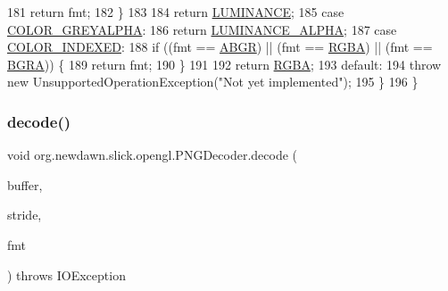 \begin{DoxyCode}
181                 \textcolor{keywordflow}{return} fmt;
182             \}
183             
184             \textcolor{keywordflow}{return} \mbox{\hyperlink{classorg_1_1newdawn_1_1slick_1_1opengl_1_1_p_n_g_decoder_a0ecc59fd1d47827a9c16df0bfbb033d2}{LUMINANCE}};
185         \textcolor{keywordflow}{case} \mbox{\hyperlink{classorg_1_1newdawn_1_1slick_1_1opengl_1_1_p_n_g_decoder_a0d509a1ae82f19ef4da0c9f2e0671d77}{COLOR\_GREYALPHA}}:
186             \textcolor{keywordflow}{return} \mbox{\hyperlink{classorg_1_1newdawn_1_1slick_1_1opengl_1_1_p_n_g_decoder_a1bf5eb8cd445b84d0b5a0861648d1ee4}{LUMINANCE\_ALPHA}};
187         \textcolor{keywordflow}{case} \mbox{\hyperlink{classorg_1_1newdawn_1_1slick_1_1opengl_1_1_p_n_g_decoder_a229a5a6a3ed73b28cbbe7d36bc78c4d1}{COLOR\_INDEXED}}:
188             \textcolor{keywordflow}{if} ((fmt == \mbox{\hyperlink{classorg_1_1newdawn_1_1slick_1_1opengl_1_1_p_n_g_decoder_a3df8efe1a627d4c86526e3d74d13e350}{ABGR}}) || (fmt == \mbox{\hyperlink{classorg_1_1newdawn_1_1slick_1_1opengl_1_1_p_n_g_decoder_a2b0f49c7439fb444549baac99a120bfe}{RGBA}}) || (fmt == \mbox{\hyperlink{classorg_1_1newdawn_1_1slick_1_1opengl_1_1_p_n_g_decoder_a306c7b9315ccc42ea3e8c73642de3dcc}{BGRA}})) \{
189                 \textcolor{keywordflow}{return} fmt;
190             \}
191             
192             \textcolor{keywordflow}{return} \mbox{\hyperlink{classorg_1_1newdawn_1_1slick_1_1opengl_1_1_p_n_g_decoder_a2b0f49c7439fb444549baac99a120bfe}{RGBA}};
193         \textcolor{keywordflow}{default}:
194             \textcolor{keywordflow}{throw} \textcolor{keyword}{new} UnsupportedOperationException(\textcolor{stringliteral}{"Not yet implemented"});
195         \}
196     \}
\end{DoxyCode}
\mbox{\label{classorg_1_1newdawn_1_1slick_1_1opengl_1_1_p_n_g_decoder_ad9b6eabeb88368645325bfb634a133b6}} 
\subsubsection{\texorpdfstring{decode()}{decode()}}
{\footnotesize\ttfamily void org.\+newdawn.\+slick.\+opengl.\+P\+N\+G\+Decoder.\+decode (\begin{DoxyParamCaption}\item[{Byte\+Buffer}]{buffer,  }\item[{int}]{stride,  }\item[{\mbox{\hyperlink{classorg_1_1newdawn_1_1slick_1_1opengl_1_1_p_n_g_decoder_1_1_format}{Format}}}]{fmt }\end{DoxyParamCaption}) throws I\+O\+Exception\hspace{0.3cm}{\ttfamily [inline]}}



